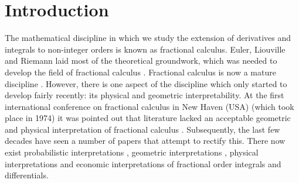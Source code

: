 \documentclass[twoside,reqno,11pt]{fcaa-var} %
\begin{document}
% 
% 
% 
% 
% 
% 
% 
% 
 
\section{Introduction}

\noindent
The mathematical discipline in which we study the extension of derivatives and integrals to non-integer orders is known as fractional calculus. Euler, Liouville and Riemann laid most 
of the theoretical groundwork, which was needed to develop the field of fractional calculus \cite{laurent1884}. Fractional calculus is now a mature discipline \cite{machado17}. 
However, there is one aspect of the discipline which only started to develop fairly recently: its physical and geometric interpretability. At the first international conference on fractional calculus in
New Haven (USA) (which took place in 1974) it was pointed out that literature lacked an acceptable geometric and physical interpretation of fractional calculus \cite{ross06}. Subsequently, the last few decades have seen 
a number of papers that attempt to rectify this. There now exist probabilistic interpretations \cite{machado03,stanislavsky04}, geometric interpretations \cite{adda97,garcia2019,podlubny02,tarasov16}, physical interpretations \cite{rutman95, nigmatullin92} and economic 
interpretations \cite{tarasova17} of fractional order integrals and differentials.\\
\end{document}
